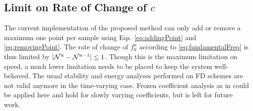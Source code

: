 \subsection{Limit on Rate of Change of $c$}
The current implementation of the proposed method can only add or remove a maximum one point per sample using Eqs. \eqref{eq:addingPoint} and \eqref{eq:removingPoint}. The rate of change of $f_0^n$ according to \eqref{eq:fundamentalFreq} is thus limited by $|\mathcal{N}^n - \mathcal{N}^{n-1}| \leq 1$. Though this is the maximum limitation on speed, a much lower limitation needs to be placed to keep the system well-behaved. The usual stability and energy analyses performed on FD schemes are not valid anymore in the time-varying case. Frozen coefficient analysis as in \cite{Strikwerda1989} could be applied here and hold for slowly varying coefficients, but is left for future work. 

